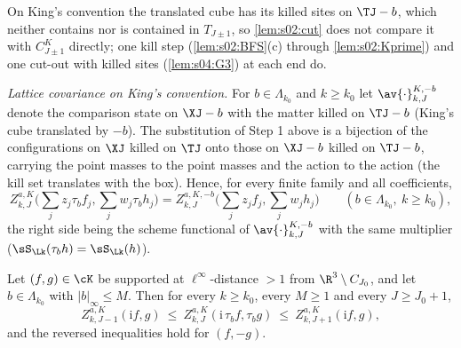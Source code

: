 On King's convention the translated cube has its killed sites on $\TJ-b$, which neither contains nor is contained in $T_{J\pm1}$, so \cref{lem:s02:cut} does not compare it with $C^K_{J\pm1}$ directly; one kill step (\cref{lem:s02:BFS}(c) through \cref{lem:s02:Kprime}) and one cut-out with killed sites (\cref{lem:s04:G3}) at each end do.

\emph{Lattice covariance on King's convention.} For $b\in\Lambda_{k_0}$ and $k\ge k_0$ let $\av{\cdot}^{K,-b}_{k,J}$ denote the comparison state on $\XJ-b$ with the matter killed on $\TJ-b$ (King's cube translated by $-b$). The substitution of Step 1 above is a bijection of the configurations on $\XJ$ killed on $\TJ$ onto those on $\XJ-b$ killed on $\TJ-b$, carrying the point masses to the point masses and the action to the action (the kill set translates with the box). Hence, for every finite family and all coefficients,
\begin{equation}\label{eq:s06:covK}
Z^{a,K}_{k,J}\Big(\sum_jz_j\tau_bf_j,\sum_jw_j\tau_bh_j\Big)=Z^{a,K,-b}_{k,J}\Big(\sum_jz_jf_j,\sum_jw_jh_j\Big)\qquad(b\in\Lambda_{k_0},\ k\ge k_0),
\end{equation}
the right side being the scheme functional of $\av{\cdot}^{K,-b}_{k,J}$ with the same multiplier ($\sS_{\Lk}(\tau_bh)=\sS_{\Lk}(h)$).

\begin{lemma}\label{lem:s06:TK}
Let $(f,g)\in\cK$ be supported at $\ell^\infty$-distance $>1$ from $\R^3\setminus C_{J_0}$, and let $b\in\Lambda_{k_0}$ with $|b|_\infty\le M$. Then for every $k\ge k_0$, every $M\ge1$ and every $J\ge J_0+1$,
\[
Z^{a,K}_{k,J-1}(\mathrm if,g)\ \le\ Z^{a,K}_{k,J}(\mathrm i\,\tau_bf,\tau_bg)\ \le\ Z^{a,K}_{k,J+1}(\mathrm if,g),
\]
and the reversed inequalities hold for $(f,-g)$.
\end{lemma}

